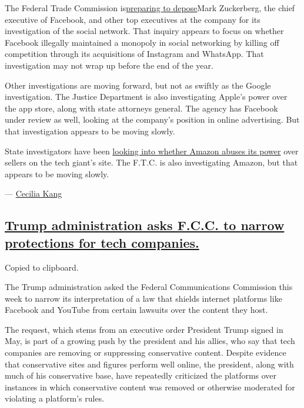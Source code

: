 The Federal Trade Commission
is\href{https://www.nytimes.com/2020/07/17/technology/ftc-facebook-investigation.html}{preparing
to depose}Mark Zuckerberg, the chief executive of Facebook, and other
top executives at the company for its investigation of the social
network. That inquiry appears to focus on whether Facebook illegally
maintained a monopoly in social networking by killing off competition
through its acquisitions of Instagram and WhatsApp. That investigation
may not wrap up before the end of the year.

Other investigations are moving forward, but not as swiftly as the
Google investigation. The Justice Department is also investigating
Apple's power over the app store, along with state attorneys general.
The agency has Facebook under review as well, looking at the company's
position in online advertising. But that investigation appears to be
moving slowly.

State investigators have been
\href{https://www.nytimes.com/2020/06/12/technology/state-inquiry-antitrust-amazon.html}{looking
into whether Amazon abuses its power} over sellers on the tech giant's
site. The F.T.C. is also investigating Amazon, but that appears to be
moving slowly.

--- \href{https://www.nytimes.com/by/cecilia-kang}{Cecilia Kang}

\hypertarget{trump-administration-asks-fcc-to-narrow-protections-for-tech-companies}{%
\subsection{\texorpdfstring{\protect\hyperlink{trump-administration-asks-fcc-to-narrow-protections-for-tech-companies}{Trump
administration asks F.C.C. to narrow protections for tech
companies.}}{Trump administration asks F.C.C. to narrow protections for tech companies.}}\label{trump-administration-asks-fcc-to-narrow-protections-for-tech-companies}}

Copied to clipboard.

The Trump administration asked the Federal Communications Commission
this week to narrow its interpretation of a law that shields internet
platforms like Facebook and YouTube from certain lawsuits over the
content they host.

The request, which stems from an executive order President Trump signed
in May, is part of a growing push by the president and his allies, who
say that tech companies are removing or suppressing conservative
content. Despite evidence that conservative sites and figures perform
well online, the president, along with much of his conservative base,
have repeatedly criticized the platforms over instances in which
conservative content was removed or otherwise moderated for violating a
platform's rules.

